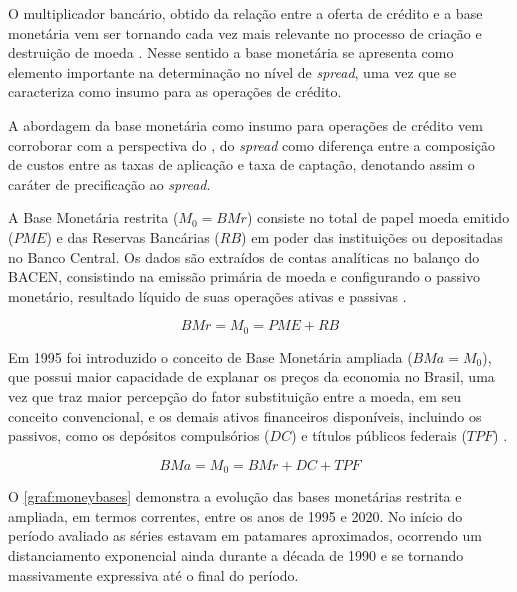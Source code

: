 \documentclass[
  12pt,
  12pt,
  openright,
  oneside,
  a4paper,
  chapter=TITLE,
  section=TITLE,
  subsection=TITLE,
  subsubsection=TITLE,
  english,
  portugues,
  sumario=tradicional]{abntex2}
\begin{document}
O multiplicador bancário, obtido da relação entre a oferta de crédito e a base monetária vem ser tornando cada vez mais relevante no processo de criação e destruição de moeda \cite{bacen:juros:1999, rey:2017, almonacid:1976}. Nesse sentido a base monetária se apresenta como elemento importante na determinação no nível de \emph{spread}, uma vez que se caracteriza como insumo para as operações de crédito.

A abordagem da base monetária como insumo para operações de crédito vem corroborar com a perspectiva do \cite{bacen:juros:1999}, do \emph{spread} como diferença entre a composição de custos entre as taxas de aplicação e taxa de captação, denotando assim o caráter de precificação ao \emph{spread}.

A Base Monetária restrita (\(M_0 = BMr\)) consiste no total de papel moeda emitido (\(PME\)) e das Reservas Bancárias (\(RB\)) em poder das instituições ou depositadas no Banco Central. Os dados são extraídos de contas analíticas no balanço do BACEN, consistindo na emissão primária de moeda e configurando o passivo monetário, resultado líquido de suas operações ativas e passivas \cite{bcb:2019}.

\begin{equation}
BMr = M_0 = PME + RB
\end{equation}

Em 1995 foi introduzido o conceito de Base Monetária ampliada (\(BMa = M_0\)), que possui maior capacidade de explanar os preços da economia no Brasil, uma vez que traz maior percepção do fator substituição entre a moeda, em seu conceito convencional, e os demais ativos financeiros disponíveis, incluindo os passivos, como os depósitos compulsórios (\(DC\)) e títulos públicos federais (\(TPF\)) \cite{bcb:2019}.

\begin{equation}
BMa = M_0 = BMr + DC +  TPF
\end{equation}

O \autoref{graf:moneybases} demonstra a evolução das bases monetárias restrita e ampliada, em termos correntes, entre os anos de 1995 e 2020. No início do período avaliado as séries estavam em patamares aproximados, ocorrendo um distanciamento exponencial ainda durante a década de 1990 e se tornando massivamente expressiva até o final do período.
\end{document}
